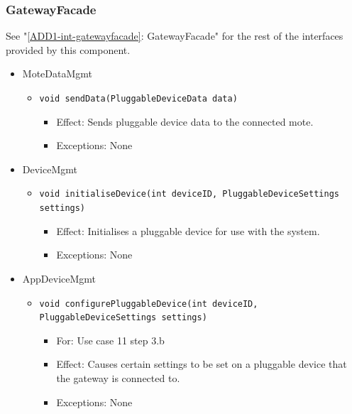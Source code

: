     \subsubsection{GatewayFacade}
        See "\ref{ADD1-int-gatewayfacade}: GatewayFacade" for the rest of the interfaces provided by this component.
        \begin{itemize}
            \item MoteDataMgmt
            \begin{itemize}
                \item \texttt{void sendData(PluggableDeviceData data)}
                \begin{itemize}
                    \item Effect: Sends pluggable device data to the connected mote.
                    \item Exceptions: None
                \end{itemize}
            \end{itemize}

            \item DeviceMgmt
            \begin{itemize}
                \item \texttt{void initialiseDevice(int deviceID, PluggableDeviceSettings settings)}
                \begin{itemize}
                    \item Effect: Initialises a pluggable device for use with the system.
                    \item Exceptions: None
                \end{itemize}
            \end{itemize}

            \item AppDeviceMgmt
            \begin{itemize}
                \item \texttt{void configurePluggableDevice(int deviceID, PluggableDeviceSettings settings)}
                \begin{itemize}
                    \item For: Use case 11 step 3.b
                    \item Effect: Causes certain settings to be set on a pluggable
                          device that the gateway is connected to.
                    \item Exceptions: None
                \end{itemize}
            \end{itemize}
        \end{itemize}

